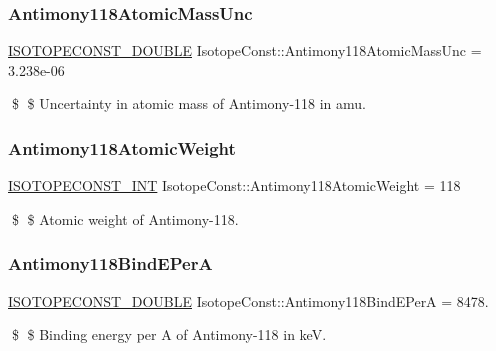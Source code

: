 \subsubsection{\texorpdfstring{Antimony118\+Atomic\+Mass\+Unc}{Antimony118AtomicMassUnc}}
{\footnotesize\ttfamily \mbox{\hyperlink{group___isotope_const-_macros_ga8f45a7272ce02c0b4c65c44636ed719a}{I\+S\+O\+T\+O\+P\+E\+C\+O\+N\+S\+T\+\_\+\+D\+O\+U\+B\+LE}} Isotope\+Const\+::\+Antimony118\+Atomic\+Mass\+Unc = 3.\+238e-\/06}

\$ \$ Uncertainty in atomic mass of Antimony-\/118 in amu. \mbox{\label{group___isotope_const-_antimony-_sb118_gab48930b4ec0af85ef4e947e227e0b497}} 
\subsubsection{\texorpdfstring{Antimony118\+Atomic\+Weight}{Antimony118AtomicWeight}}
{\footnotesize\ttfamily \mbox{\hyperlink{group___isotope_const-_macros_ga5f18360b3e99483a35c32d789e62621c}{I\+S\+O\+T\+O\+P\+E\+C\+O\+N\+S\+T\+\_\+\+I\+NT}} Isotope\+Const\+::\+Antimony118\+Atomic\+Weight = 118}

\$ \$ Atomic weight of Antimony-\/118. \mbox{\label{group___isotope_const-_antimony-_sb118_ga0eb4e4bd34c29a9b681bc7b14e00e416}} 
\subsubsection{\texorpdfstring{Antimony118\+Bind\+E\+PerA}{Antimony118BindEPerA}}
{\footnotesize\ttfamily \mbox{\hyperlink{group___isotope_const-_macros_ga8f45a7272ce02c0b4c65c44636ed719a}{I\+S\+O\+T\+O\+P\+E\+C\+O\+N\+S\+T\+\_\+\+D\+O\+U\+B\+LE}} Isotope\+Const\+::\+Antimony118\+Bind\+E\+PerA = 8478.}

\$ \$ Binding energy per A of Antimony-\/118 in keV. \mbox{\label{group___isotope_const-_antimony-_sb118_gadbbeba97e337d0e57ae90719e9f9a81e}} 

